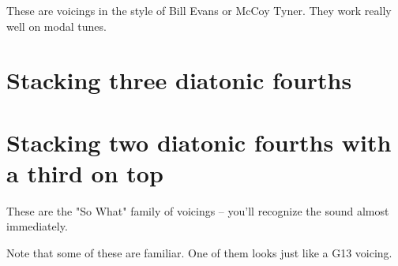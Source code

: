 
These are voicings in the style of Bill Evans or McCoy Tyner.  They work really well on modal tunes.

\section{Stacking three diatonic fourths}



\section{Stacking two diatonic fourths with a third on top}

These are the "So What" family of voicings -- you'll recognize the sound almost immediately.



Note that some of these are familiar.  One of them looks just like a G13 voicing.
